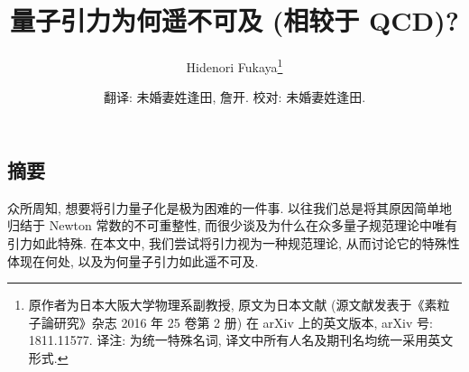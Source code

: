 \documentclass{article}
\title{\textbf{量子引力为何遥不可及 (相较于 QCD)?}}
\author{Hidenori Fukaya\footnote{原作者为日本大阪大学物理系副教授, 原文为日本文献 (源文献发表于《素粒子論研究》杂志 2016 年 25 卷第 2 册) 在 arXiv 上的英文版本, arXiv 号: 1811.11577. 译注: 为统一特殊名词, 译文中所有人名及期刊名均统一采用英文形式.}}
\date{翻译: 未婚妻姓逢田, 詹开. 校对: 未婚妻姓逢田.}
\begin{document}
\CJKspace
\newpage
{}
\newpage
{}
\maketitle


\begin{center}
\section*{摘要}
\end{center}
众所周知, 想要将引力量子化是极为困难的一件事. 以往我们总是将其原因简单地归结于 Newton 常数的不可重整性, 而很少谈及为什么在众多量子规范理论中唯有引力如此特殊. 在本文中, 我们尝试将引力视为一种规范理论, 从而讨论它的特殊性体现在何处, 以及为何量子引力如此遥不可及.
\end{document}
